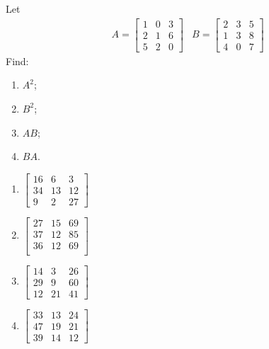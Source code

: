\begin{Exercise}
Let 
\begin{align*}
& A =
\begin{bmatrix}
1 & 0 & 3\\
2 & 1 & 6\\
5 & 2 & 0
\end{bmatrix}
& B =
\begin{bmatrix}
2 & 3 & 5\\
1 & 3 & 8\\
4 & 0 & 7
\end{bmatrix}
\end{align*}
Find:
\begin{enumerate}[label=(\alph*)]
\item $A^2$;
\item $B^2$;
\item $AB$;
\item $BA$.
\end{enumerate}
\end{Exercise}
\begin{Answer}
\begin{enumerate}[label=(\alph*)]
\item $\begin{bmatrix}
16 & 6 & 3 \\
34 & 13 & 12 \\
9 & 2 & 27
\end{bmatrix}$
\item $\begin{bmatrix}
27 & 15 & 69 \\
37 & 12 & 85 \\
36 & 12 & 69 \\
\end{bmatrix}$
\item $\begin{bmatrix}
14 & 3 & 26 \\
29 & 9 & 60 \\
12 & 21 & 41
\end{bmatrix}$
\item $\begin{bmatrix}
33 & 13 & 24 \\
47 & 19 & 21 \\
39 & 14 & 12
\end{bmatrix}$
\end{enumerate}    
\end{Answer}

